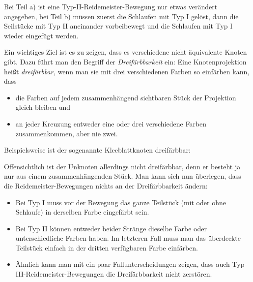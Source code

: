 \documentclass{zusammenfassung}
\begin{document}
Bei Teil a) ist eine Typ-II-Reidemeister-Bewegung nur etwas verändert angegeben, bei Teil b) müssen zuerst die Schlaufen mit Typ I
gelöst, dann die Seilstücke mit Typ II aneinander vorbeibewegt und die Schlaufen mit Typ I wieder eingefügt werden.

Ein wichtiges Ziel ist es zu zeigen, dass es verschiedene nicht äquivalente Knoten gibt. Dazu führt man den Begriff der
\emph{Dreifärbbarkeit} ein: Eine Knotenprojektion heißt \emph{dreifärbbar,} wenn man sie mit drei verschiedenen Farben so
einfärben kann, dass
\begin{itemize}
  \item die Farben auf jedem zusammenhängend sichtbaren Stück der Projektion gleich bleiben und
  \item an jeder Kreuzung entweder eine oder drei verschiedene Farben zusammenkommen, aber nie zwei.
\end{itemize}

Beispielsweise ist der sogenannte Kleeblattknoten dreifärbbar:

\begin{center}
\end{center}

Offensichtlich ist der Unknoten allerdings nicht dreifärbbar, denn er besteht ja nur aus einem zusammenhängenden Stück. Man kann
sich nun überlegen, dass die Reidemeister-Be\-we\-gun\-gen nichts an der Dreifärbbarkeit ändern:
\begin{itemize}
  \item Bei Typ I muss vor der Bewegung das ganze Teilstück (mit oder ohne Schlaufe) in derselben Farbe eingefärbt sein.
  \item Bei Typ II können entweder beider Stränge dieselbe Farbe oder unterschiedliche Farben haben. Im letzteren Fall muss man
    das überdeckte Teilstück einfach in der dritten verfügbaren Farbe einfärben. 
  \item Ähnlich kann man mit ein paar Fallunterscheidungen zeigen, dass auch Typ-III-Rei\-de\-mei\-ster-Bewegungen die 
    Dreifärbbarkeit nicht zerstören.
\end{itemize}
\end{document}
